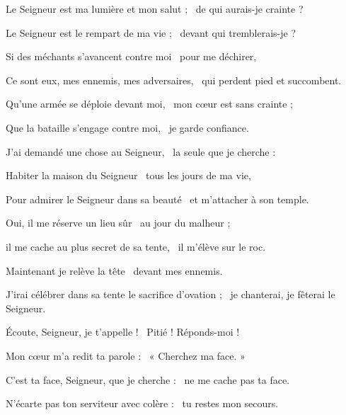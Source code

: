 \item Le Seigneur est ma lumière et mon salut ;~\psstar{} de qui aurais-je crainte ?

\item Le Seigneur est le rempart de ma vie ;~\psstar{} devant qui tremblerais-je ?

\item Si des méchants s'avancent contre moi~\psstar{} pour me déchirer,

\item Ce sont eux, mes ennemis, mes adversaires,~\psstar{} qui perdent pied et succombent.

\item Qu'une armée se déploie devant moi,~\psstar{} mon cœur est sans crainte ;

\item Que la bataille s'engage contre moi,~\psstar{} je garde confiance.

\item J'ai demandé une chose au Seigneur,~\psstar{} la seule que je cherche :

\item Habiter la maison du Seigneur~\psstar{} tous les jours de ma vie,

\item Pour admirer le Seigneur dans sa beauté~\psstar{} et m'attacher à son temple.

\item Oui, il me réserve un lieu sûr~\psstar{} au jour du malheur ;

\item il me cache au plus secret de sa tente,~\psstar{} il m'élève sur le roc.

\item Maintenant je relève la tête~\psstar{} devant mes ennemis.

\item J'irai célébrer dans sa tente le sacrifice d'ovation ;~\psstar{} je chanterai, je fêterai le Seigneur.

\item Écoute, Seigneur, je t'appelle !~\psstar{} Pitié ! Réponds-moi !

\item Mon cœur m'a redit ta parole :~\psstar{} « Cherchez ma face. »

\item C'est ta face, Seigneur, que je cherche :~\psstar{} ne me cache pas ta face.

\item N'écarte pas ton serviteur avec colère :~\psstar{} tu restes mon secours.

